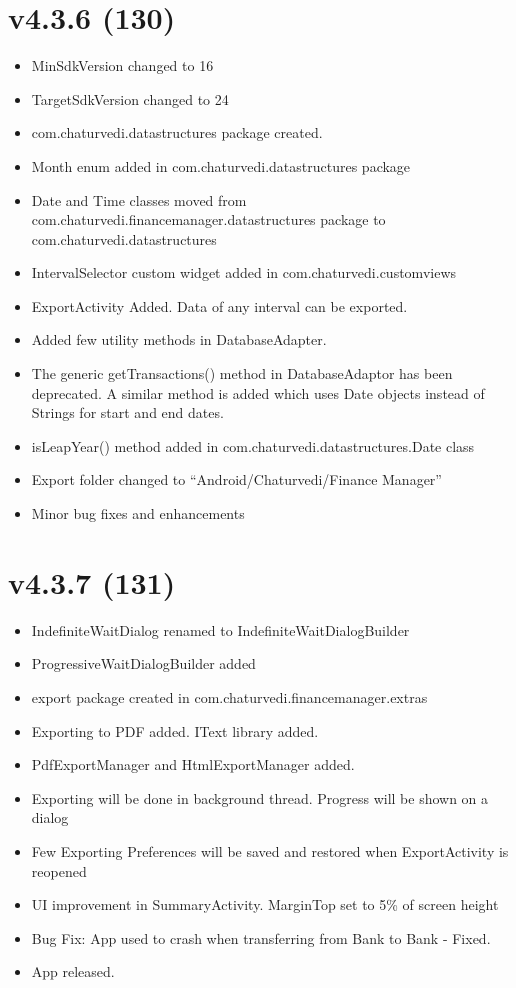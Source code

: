 \documentclass{article}
\begin{document}
    \section{v4.3.6 (130)}\label{sec:130}
    \begin{itemize}
        \item MinSdkVersion changed to 16
        \item TargetSdkVersion changed to 24
        \item com.chaturvedi.datastructures package created.
        \item Month enum added in com.chaturvedi.datastructures package
        \item Date and Time classes moved from com.chaturvedi.financemanager.datastructures package to com.chaturvedi.datastructures
        \item IntervalSelector custom widget added in com.chaturvedi.customviews
        \item ExportActivity Added.
        Data of any interval can be exported.
        \item Added few utility methods in DatabaseAdapter.
        \item The generic getTransactions() method in DatabaseAdaptor has been deprecated.
        A similar method is added which uses Date objects instead of Strings for start and end dates.
        \item isLeapYear() method added in com.chaturvedi.datastructures.Date class
        \item Export folder changed to ``Android/Chaturvedi/Finance Manager''
        \item Minor bug fixes and enhancements
    \end{itemize}

    \section{v4.3.7 (131)}\label{sec:131}
    \begin{itemize}
        \item IndefiniteWaitDialog renamed to IndefiniteWaitDialogBuilder
        \item ProgressiveWaitDialogBuilder added
        \item export package created in com.chaturvedi.financemanager.extras
        \item Exporting to PDF added.
        IText library added.
        \item PdfExportManager and HtmlExportManager added.
        \item Exporting will be done in background thread.
        Progress will be shown on a dialog
        \item Few Exporting Preferences will be saved and restored when ExportActivity is reopened
        \item UI improvement in SummaryActivity.
        MarginTop set to 5\% of screen height
        \item Bug Fix: App used to crash when transferring from Bank to Bank - Fixed.
        \item App released.
    \end{itemize}
\end{document}
